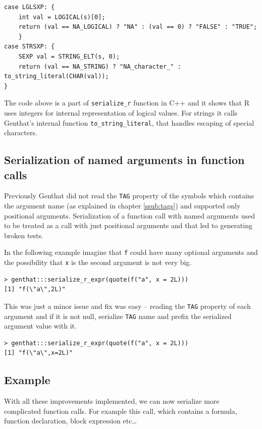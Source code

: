 \documentclass[thesis=B,english]{FITthesis}[2012/10/20]
\begin{document}
\begin{verbatim}
case LGLSXP: {
    int val = LOGICAL(s)[0];
    return (val == NA_LOGICAL) ? "NA" : (val == 0) ? "FALSE" : "TRUE";
    }
case STRSXP: {
    SEXP val = STRING_ELT(s, 0);
    return (val == NA_STRING) ? "NA_character_" : to_string_literal(CHAR(val));
}
\end{verbatim}

The code above is a part of \verb|serialize_r| function in C++ and it shows that R uses integers for internal representation of logical values. For strings it calls Genthat’s internal function \verb|to_string_literal|, that handles escaping of special characters.

\subsection{Serialization of named arguments in function calls}
Previously Genthat did not read the \verb|TAG| property of the symbols which contains the argument name (as explained in chapter \ref{ssub:tags}) and supported only positional arguments. Serialization of a function call with named arguments used to be treated as a call with just positional arguments and that led to generating broken tests.

In the following example imagine that \verb|f| could have many optional arguments and the possibility that \verb|x| is the second argument is not very big. 


\begin{verbatim}
> genthat:::serialize_r_expr(quote(f("a", x = 2L)))
[1] "f(\"a\",2L)"
\end{verbatim}

This was just a minor issue and fix was easy – reading the \verb|TAG| property of each argument and if it is not null, serialize \verb|TAG| name and prefix the serialized argument value with it.

\begin{verbatim}
> genthat:::serialize_r_expr(quote(f("a", x = 2L)))
[1] "f(\"a\",x=2L)"
\end{verbatim}

\subsection{Example}
With all these improvements implemented, we can now serialize more complicated function calls. For example this call, which contains a formula, function declaration, block expression etc\ldots
\end{document}
